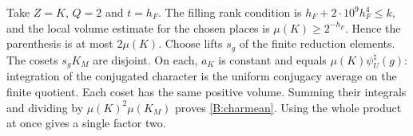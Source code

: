 Take $Z=K$, $Q=2$ and $t=h_F$. The filling rank condition is
$h_F+2\cdot10^9 h_F^4\le k$, and the local volume estimate for the
chosen places is $\mu(K)\ge2^{-h_F}$. Hence the parenthesis is at most
$2\mu(K)$. Choose lifts $s_g$ of the finite reduction elements. The
cosets $s_gK_M$ are disjoint. On each, $a_K$ is constant and equals
$\mu(K)\psi_U^\natural(g)$: integration of the conjugated character
is the uniform conjugacy average on the finite quotient. Each coset
has the same positive volume. Summing their integrals and dividing by
$\mu(K)^2\mu(K_M)$ proves \eqref{B:charmean}. Using the whole
product at once gives a single factor two.


